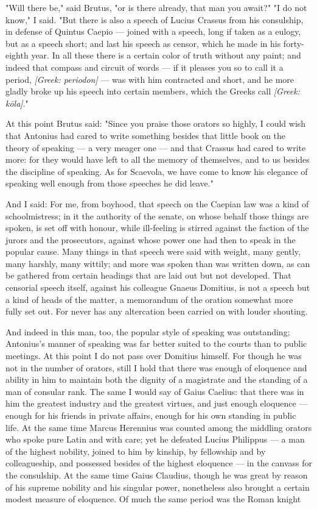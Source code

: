  "Will there be," said Brutus, "or is there already, that man you await?" "I do not know," I said. "But there is also a speech of Lucius Crassus from his consulship, in defense of Quintus Caepio — joined with a speech, long if taken as a eulogy, but as a speech short; and last his speech as censor, which he made in his forty-eighth year. In all these there is a certain color of truth without any paint; and indeed that compass and circuit of words — if it pleases you so to call it a period, \textit{[Greek: periodon]} — was with him contracted and short, and he more gladly broke up his speech into certain members, which the Greeks call \textit{[Greek: kōla]}."

 At this point Brutus said: "Since you praise those orators so highly, I could wish that Antonius had cared to write something besides that little book on the theory of speaking — a very meager one — and that Crassus had cared to write more: for they would have left to all the memory of themselves, and to us besides the discipline of speaking. As for Scaevola, we have come to know his elegance of speaking well enough from those speeches he did leave."

 And I said: For me, from boyhood, that speech on the Caepian law was a kind of schoolmistress; in it the authority of the senate, on whose behalf those things are spoken, is set off with honour, while ill-feeling is stirred against the faction of the jurors and the prosecutors, against whose power one had then to speak in the popular cause. Many things in that speech were said with weight, many gently, many harshly, many wittily; and more was spoken than was written down, as can be gathered from certain headings that are laid out but not developed. That censorial speech itself, against his colleague Gnaeus Domitius, is not a speech but a kind of heads of the matter, a memorandum of the oration somewhat more fully set out. For never has any altercation been carried on with louder shouting.

 And indeed in this man, too, the popular style of speaking was outstanding; Antonius's manner of speaking was far better suited to the courts than to public meetings. At this point I do not pass over Domitius himself. For though he was not in the number of orators, still I hold that there was enough of eloquence and ability in him to maintain both the dignity of a magistrate and the standing of a man of consular rank. The same I would say of Gaius Caelius: that there was in him the greatest industry and the greatest virtues, and just enough eloquence — enough for his friends in private affairs, enough for his own standing in public life. At the same time Marcus Herennius was counted among the middling orators who spoke pure Latin and with care; yet he defeated Lucius Philippus — a man of the highest nobility, joined to him by kinship, by fellowship and by colleagueship, and possessed besides of the highest eloquence — in the canvass for the consulship. At the same time Gaius Claudius, though he was great by reason of his supreme nobility and his singular power, nonetheless also brought a certain modest measure of eloquence. Of much the same period was the Roman knight

